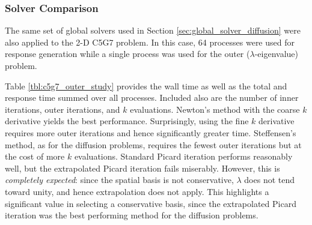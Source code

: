 \subsubsection{Solver Comparison}

The same set of global solvers used in 
Section \ref{sec:global_solver_diffusion} were also applied 
to the 2-D C5G7 problem.  In this case, 64 processes were used 
for response generation while a
single process was used for the outer ($\lambda$-eigenvalue) problem.

Table \ref{tbl:c5g7_outer_study} provides the wall time
as well as the total and response time summed over all 
processes.  Included also are the number of inner iterations,
outer iterations, and $k$ evaluations.  Newton's method with the 
coarse $k$ derivative yields the best performance.  Surprisingly,
using the fine $k$ derivative requires more outer iterations and 
hence significantly greater time.  Steffensen's method, as for the 
diffusion problems, requires the fewest outer iterations but at the 
cost of more $k$ evaluations.  Standard Picard iteration 
performs reasonably well, but the extrapolated Picard iteration
fails miserably.  However, this is {\it completely expected}: since 
the spatial basis is not conservative,  $\lambda$ does not 
tend toward unity, and hence extrapolation does not apply.  This 
highlights a significant value in selecting a conservative basis, 
since the extrapolated Picard iteration was the best performing 
method for the diffusion problems.

